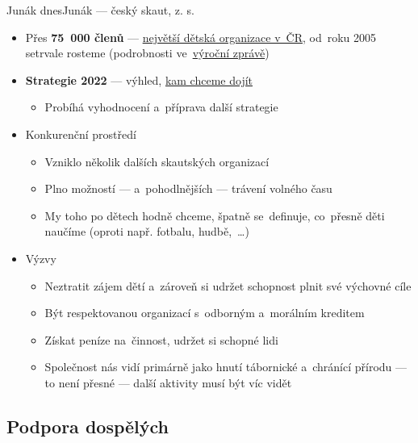 \documentclass[compress, ucs, xelatex, 11pt, xcolor=dvipsnames, print, aspectratio=169,
	hyperref={
		bookmarks=true,
		unicode=true,
		colorlinks=true,
		pdftitle={Skautska vychovna metoda},
		plainpages=false,
		pdfauthor={Vojtech Zeisek},
		pdfsubject={Skautska vychovna metoda a jeji vyvoj za posledni stoleti a desetileti},
		pdfcreator={XeLaTeX},
		pdfkeywords={Junak, Pedagogika, Skaut, Skauting, Vychovna metoda},
		linkcolor=Red, %
		anchorcolor=ForestGreen, %
		citecolor=ForestGreen, %
		filecolor=ForestGreen, %
		menucolor=ForestGreen, %
		urlcolor=Sepia, %
		pdftex},
	url={hyphens, lowtilde} %
	]{beamer}
\begin{document}
\begin{frame}{Junák dnes}{Junák --- český skaut, z. s.}
	\begin{itemize}
		\item Přes \textbf{75~000 členů} --- \href{https://www.skaut.cz/skauting/}{největší dětská organizace v~ČR}, od~roku 2005 setrvale rosteme (podrobnosti ve~\href{https://krizovatka.skaut.cz/stredisko/propagace/propagacni-materialy/vyrocni-zpravy/1002-vyrocni-zpravy}{výroční zprávě})
		\item \textbf{Strategie 2022} --- výhled, \href{https://krizovatka.skaut.cz/organizace/ustredi/strategie2022}{kam chceme dojít}
		\begin{itemize}
			\item Probíhá vyhodnocení a~příprava další strategie
		\end{itemize}
		\item Konkurenční prostředí
		\begin{itemize}
			\item Vzniklo několik dalších skautských organizací
			\item Plno možností --- a~pohodlnějších --- trávení volného času
			\item My toho po dětech hodně chceme, špatně se~definuje, co~přesně děti naučíme (oproti např. fotbalu, hudbě,~\ldots)
		\end{itemize}
		\item Výzvy
		\begin{itemize}
			\item Neztratit zájem dětí a~zároveň si udržet schopnost plnit své výchovné cíle
			\item Být respektovanou organizací s~odborným a~morálním kreditem
			\item Získat peníze na~činnost, udržet si schopné lidi
			\item Společnost nás vidí primárně jako hnutí tábornické a~chránící přírodu --- to není přesné --- další aktivity musí být víc vidět
		\end{itemize}
	\end{itemize}
\end{frame}

\subsection{Podpora dospělých}
\end{document}
